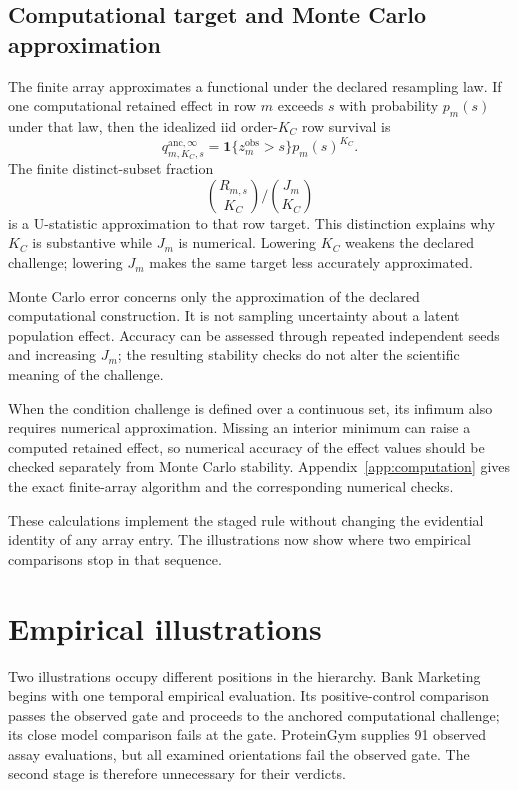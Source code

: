 \documentclass[11pt]{article}
\theoremstyle{remark}
\begin{document}
\subsection{Computational target and Monte Carlo approximation}

The finite array approximates a functional under the declared resampling law.
If one computational retained effect in row $m$ exceeds $s$ with probability
$p_m(s)$ under that law, then the idealized iid order-$K_C$ row survival is
\begin{equation}
q^{\mathrm{anc},\infty}_{m,K_C,s}
=
\mathbf 1\{z_m^{\mathrm{obs}}>s\}p_m(s)^{K_C}.
\label{eq:ideal-row-survival}
\end{equation}
The finite distinct-subset fraction
\[
\binom{R_{m,s}}{K_C}/\binom{J_m}{K_C}
\]
is a U-statistic approximation to that row target. This distinction explains
why $K_C$ is substantive while $J_m$ is numerical. Lowering $K_C$ weakens the
declared challenge; lowering $J_m$ makes the same target less accurately
approximated.

Monte Carlo error concerns only the approximation of the declared
computational construction. It is not sampling uncertainty about a latent
population effect. Accuracy can be assessed through repeated independent seeds
and increasing $J_m$; the resulting stability checks do not alter the
scientific meaning of the challenge.

When the condition challenge is defined over a continuous set, its infimum
also requires numerical approximation. Missing an interior minimum can raise a
computed retained effect, so numerical accuracy of the effect values should be
checked separately from Monte Carlo stability. Appendix~\ref{app:computation}
gives the exact finite-array algorithm and the corresponding numerical checks.

These calculations implement the staged rule without changing the evidential
identity of any array entry. The illustrations now show where two empirical
comparisons stop in that sequence.

\section{Empirical illustrations}
\label{sec:illustrations}

Two illustrations occupy different positions in the hierarchy. Bank
Marketing begins with one temporal empirical evaluation. Its positive-control
comparison passes the observed gate and proceeds to the anchored computational
challenge; its close model comparison fails at the gate. ProteinGym supplies
91 observed assay evaluations, but all examined orientations fail the observed
gate. The second stage is therefore unnecessary for their verdicts.
\end{document}
